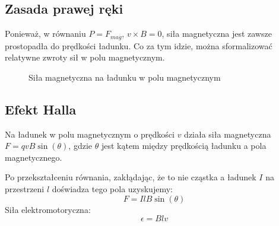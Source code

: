 \documentclass{../notatki}
\begin{document}
\subsection{Zasada prawej ręki}

Ponieważ, w równaniu $P = F_{mag}$, $v \times B = 0$, siła
magnetyczna jest zawsze prostopadła do prędkości ładunku.
Co za tym idzie, można sformalizować relatywne zwroty sił w polu magnetycznym.
\begin{figure}[h]
  \centering
  \caption{Siła magnetyczna na ładunku w polu magnetycznym}
\end{figure}

\subsection{Efekt Halla}

Na ładunek w polu magnetycznym o prędkości $v$ działa siła
magnetyczna $F = qvB \sin(\theta)$, gdzie $\theta$ jest kątem między
prędkością ładunku a pola magnetycznego.

\begin{figure}[h]
  \centering
\end{figure}

Po przekształceniu równania, zakłądając, że to nie cząstka a ładunek $I$ na
przestrzeni $l$ doświadza tego pola uzyskujemy:
$$
F = IlB \sin(\theta)
$$
Siła elektromotoryczna:
$$
\epsilon = Blv
$$
\end{document}
